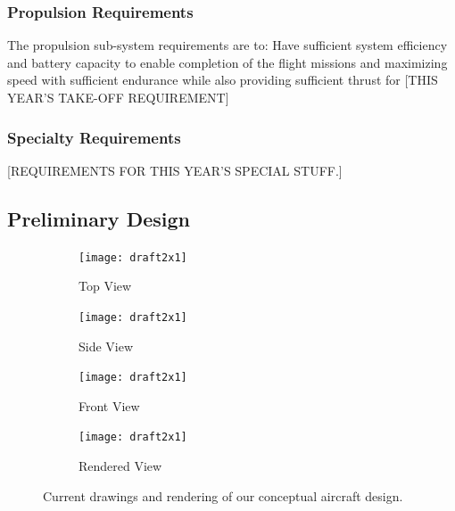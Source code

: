 \documentclass[proposal]{byu-aero}
\begin{document}
\subsubsection{Propulsion Requirements}
\label{sssec:PropulsionReqs}

The propulsion sub-system requirements are to: Have sufficient system efficiency and battery capacity to enable completion of the flight missions and maximizing speed with sufficient endurance while also providing sufficient thrust for {\color{BYUred}[THIS YEAR'S TAKE-OFF REQUIREMENT]}

\subsubsection{Specialty Requirements} %
\label{sssec:SpecialReqs}

{\color{BYUred}[REQUIREMENTS FOR THIS YEAR'S SPECIAL STUFF.]}



\subsection{Preliminary Design}
\label{ssec:PreliminaryDesign}

\begin{figure}[h!]
	\centering
	\begin{subfigure}[b]{0.475\textwidth}
		\texttt{[image: draft2x1]}
		\caption{Top View}
		\label{fig:topview}
	\end{subfigure}
	\begin{subfigure}[b]{0.475\textwidth}
		\texttt{[image: draft2x1]}
		\caption{Side View}
		\label{fig:sideview}
	\end{subfigure}

	\begin{subfigure}[b]{0.475\textwidth}
		\texttt{[image: draft2x1]}
		\caption{Front View}
		\label{fig:frontview}
	\end{subfigure}
	\begin{subfigure}[b]{0.475\textwidth}
		\texttt{[image: draft2x1]}
		\caption{Rendered View}
		\label{fig:renderedview}
	\end{subfigure}
	\caption{Current drawings and rendering of our conceptual aircraft design.}
	\label{fig:prelimdrawings}
\end{figure}
\end{document}
